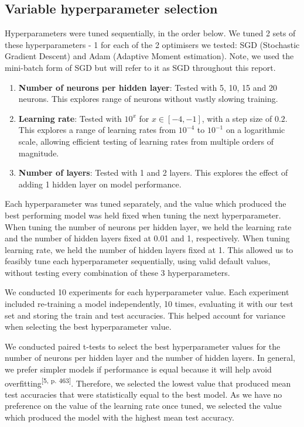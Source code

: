 \documentclass[conference]{IEEEtran}
\begin{document}
\text{}
\subsection{Variable hyperparameter selection}
Hyperparameters were tuned sequentially, in the order below. We tuned 2 sets of these hyperparameters - 1 for each of the 2 optimisers we tested: SGD (Stochastic Gradient Descent) and Adam (Adaptive Moment estimation). Note, we used the mini-batch form of SGD but will refer to it as SGD throughout this report. 
\begin{enumerate}
    \item \textbf{Number of neurons per hidden layer}: Tested with 5, 10, 15 and 20 neurons. This explores range of neurons without vastly slowing training. 
    \item \textbf{Learning rate}: Tested with $10^x$ for \mbox{$x\in[-4, -1]$}, with a step size of $0.2$. This explores a range of learning rates from $10^{-4}$ to $10^{-1}$ on a logarithmic scale, allowing efficient testing of learning rates from multiple orders of magnitude.
    \item \textbf{Number of layers}: Tested with 1 and 2 layers. This explores the effect of adding 1 hidden layer on model performance.
\end{enumerate}
Each hyperparameter was tuned separately, and  the value which produced the best performing model was held fixed when tuning the next hyperparameter.
When tuning the number of neurons per hidden layer, we held the learning rate and the number of hidden layers fixed at 0.01 and 1, respectively. When tuning learning rate, we held the number of hidden layers fixed at 1. This allowed us to feasibly tune each hyperparameter sequentially, using valid default values, without testing every combination of these 3 hyperparameters.

We conducted 10 experiments for each hyperparameter value. Each experiment included re-training a model independently, 10 times, evaluating it with our test set and storing the train and test accuracies. This helped account for variance when selecting the best hyperparameter value.

We conducted paired t-tests to select the best hyperparameter values for the number of neurons per hidden layer and the number of hidden layers. In general, we prefer simpler models if performance is equal because it will help avoid overfitting\textsuperscript{[5, p. 463]}. Therefore, we selected the lowest value that produced mean test accuracies that were statistically equal to the best model. As we have no preference on the value of the learning rate once tuned, we selected the value which produced the model with the highest mean test accuracy.
\end{document}

